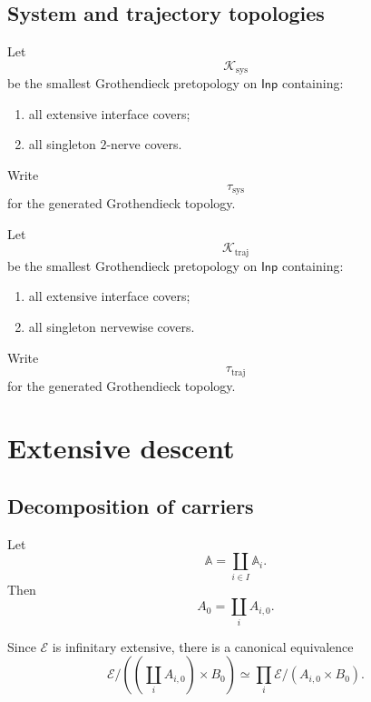 \subsection{System and trajectory topologies}
\label{subsec:system-trajectory-topologies}

\begin{definition}
\label{def:system-interface-pretopology}
Let
\[
    \mathcal K_{\mathrm{sys}}
\]
be the smallest Grothendieck pretopology on \(\mathsf{Inp}\) containing:
\begin{enumerate}
    \item all extensive interface covers;
    \item all singleton \(2\)-nerve covers.
\end{enumerate}
Write
\[
    \tau_{\mathrm{sys}}
\]
for the generated Grothendieck topology.
\end{definition}

\begin{definition}
\label{def:trajectory-interface-pretopology}
Let
\[
    \mathcal K_{\mathrm{traj}}
\]
be the smallest Grothendieck pretopology on \(\mathsf{Inp}\) containing:
\begin{enumerate}
    \item all extensive interface covers;
    \item all singleton nervewise covers.
\end{enumerate}
Write
\[
    \tau_{\mathrm{traj}}
\]
for the generated Grothendieck topology.
\end{definition}

\section{Extensive descent}
\label{sec:extensive-descent-input-interfaces}

\subsection{Decomposition of carriers}
\label{subsec:extensive-decomposition-carriers}

Let
\[
    \mathbb A
    =
    \coprod_{i\in I}\mathbb A_i.
\]
Then
\[
    A_0=\coprod_iA_{i,0}.
\]

Since \(\mathcal E\) is infinitary extensive, there is a canonical equivalence
\[
    \mathcal E/
    \left(
        \left(
            \coprod_iA_{i,0}
        \right)
        \times B_0
    \right)
    \simeq
    \prod_i
    \mathcal E/(A_{i,0}\times B_0).
\]

